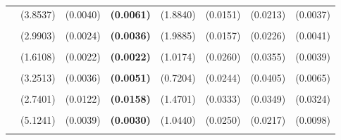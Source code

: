 \documentclass[
  12pt,
]{article}
\begin{document}
\begin{table}[H]
{\begin{tabular}[t]{lll>{}lllll}
 & (3.8537) & (0.0040) & \textbf{(0.0061)} & (1.8840) & (0.0151) & (0.0213) & (0.0037)\\
\addlinespace
\cellcolor{gray!6}{c.hamilton28.panel} & \cellcolor{gray!6}{-89.7510} & \cellcolor{gray!6}{0.7354} & \textbf{\cellcolor{gray!6}{0.6705}} & \cellcolor{gray!6}{10.0439} & \cellcolor{gray!6}{0.3930} & \cellcolor{gray!6}{0.2585} & \cellcolor{gray!6}{0.2220}\\
 & (2.9903) & (0.0024) & \textbf{(0.0036)} & (1.9885) & (0.0157) & (0.0226) & (0.0041)\\
\addlinespace
\cellcolor{gray!6}{c.hamilton13.panel} & \cellcolor{gray!6}{-101.4619} & \cellcolor{gray!6}{0.7184} & \textbf{\cellcolor{gray!6}{0.6665}} & \cellcolor{gray!6}{6.7644} & \cellcolor{gray!6}{0.3714} & \cellcolor{gray!6}{0.2983} & \cellcolor{gray!6}{0.2287}\\
 & (1.6108) & (0.0022) & \textbf{(0.0022)} & (1.0174) & (0.0260) & (0.0355) & (0.0039)\\
\addlinespace
\cellcolor{gray!6}{c.ma} & \cellcolor{gray!6}{-69.1570} & \cellcolor{gray!6}{0.7091} & \textbf{\cellcolor{gray!6}{0.6630}} & \cellcolor{gray!6}{6.0750} & \cellcolor{gray!6}{0.3994} & \cellcolor{gray!6}{0.2818} & \cellcolor{gray!6}{0.2410}\\
 & (3.2513) & (0.0036) & \textbf{(0.0051)} & (0.7204) & (0.0244) & (0.0405) & (0.0065)\\
\addlinespace
\cellcolor{gray!6}{c.bn6.r20} & \cellcolor{gray!6}{-72.3756} & \cellcolor{gray!6}{0.7062} & \textbf{\cellcolor{gray!6}{0.6353}} & \cellcolor{gray!6}{0.6105} & \cellcolor{gray!6}{0.4187} & \cellcolor{gray!6}{0.3028} & \cellcolor{gray!6}{0.2691}\\
 & (2.7401) & (0.0122) & \textbf{(0.0158)} & (1.4701) & (0.0333) & (0.0349) & (0.0324)\\
\addlinespace
\cellcolor{gray!6}{c.hp125k} & \cellcolor{gray!6}{-71.8112} & \cellcolor{gray!6}{0.6930} & \textbf{\cellcolor{gray!6}{0.6351}} & \cellcolor{gray!6}{3.5090} & \cellcolor{gray!6}{0.4030} & \cellcolor{gray!6}{0.3057} & \cellcolor{gray!6}{0.2568}\\
 & (5.1241) & (0.0039) & \textbf{(0.0030)} & (1.0440) & (0.0250) & (0.0217) & (0.0098)\\
\addlinespace
\textbf{\cellcolor{gray!6}{BIS Basel gap}} & \textbf{\cellcolor{gray!6}{-87.6905}} & \textbf{\cellcolor{gray!6}{0.7089}} & \textbf{\textbf{\cellcolor{gray!6}{0.6350}}} & \textbf{\cellcolor{gray!6}{4.4951}} & \textbf{\cellcolor{gray!6}{0.3818}} & \textbf{\cellcolor{gray!6}{0.3131}} & \textbf{\cellcolor{gray!6}{0.2451}}\\

\end{tabular}}
\end{table}
\end{document}
